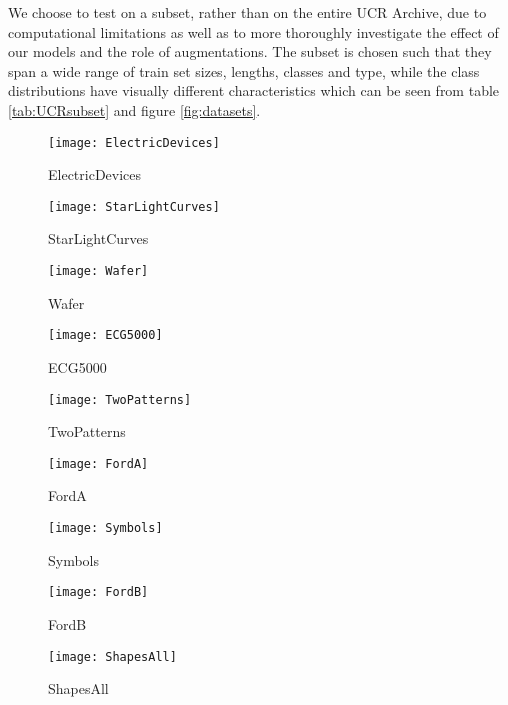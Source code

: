 \documentclass[../../thesis.tex]{subfiles}
\begin{document}
We choose to test on a subset, rather than on the entire UCR Archive, due to computational limitations as well as to more thoroughly investigate the effect of our models and the role of augmentations. The subset is chosen such that they span a wide range of train set sizes, lengths, classes and type, while the class distributions have visually different characteristics which can be seen from table \ref{tab:UCRsubset} and figure \ref{fig:datasets}. 

\begin{figure}[h]
    \centering
    \begin{minipage}[b]{0.32\textwidth}
        \centering
        \texttt{[image: ElectricDevices]}
        \caption*{ElectricDevices}
    \end{minipage}
    \hfill
    \begin{minipage}[b]{0.32\textwidth}
        \centering
        \texttt{[image: StarLightCurves]}
        \caption*{StarLightCurves}
    \end{minipage}
    \hfill
    \begin{minipage}[b]{0.32\textwidth}
        \centering
        \texttt{[image: Wafer]}
        \caption*{Wafer}
    \end{minipage}
    
    \vspace{0.4cm}
    
    \begin{minipage}[b]{0.32\textwidth}
        \centering
        \texttt{[image: ECG5000]}
        \caption*{ECG5000}
    \end{minipage}
    \hfill
    \begin{minipage}[b]{0.32\textwidth}
        \centering
        \texttt{[image: TwoPatterns]}
        \caption*{TwoPatterns}
    \end{minipage}
    \hfill
    \begin{minipage}[b]{0.32\textwidth}
        \centering
        \texttt{[image: FordA]}
        \caption*{FordA}
    \end{minipage}
    
    \vspace{0.4cm}
    
    \begin{minipage}[b]{0.32\textwidth}
        \centering
        \texttt{[image: Symbols]}
        \caption*{Symbols}
    \end{minipage}
    \hfill
    \begin{minipage}[b]{0.32\textwidth}
        \centering
        \texttt{[image: FordB]}
        \caption*{FordB}
    \end{minipage}
    \hfill
    \begin{minipage}[b]{0.32\textwidth}
        \centering
        \texttt{[image: ShapesAll]}
        \caption*{ShapesAll}
    \end{minipage}
    

\end{figure}
\end{document}
